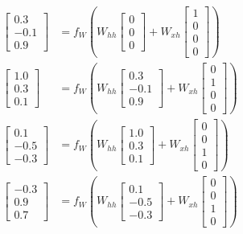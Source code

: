 \begin{align}
\begin{bmatrix} 0.3 \\ -0.1 \\ 0.9 \end{bmatrix} &= f_W \left( W_{hh} \begin{bmatrix} 0 \\ 0 \\ 0 \end{bmatrix} + W_{xh} \begin{bmatrix} 1 \\ 0 \\ 0 \\ 0 \end{bmatrix} \right) \tag{$h_1$} \\[1.5em]
\begin{bmatrix} 1.0 \\ 0.3 \\ 0.1 \end{bmatrix} &= f_W \left( W_{hh} \begin{bmatrix} 0.3 \\ -0.1 \\ 0.9 \end{bmatrix} + W_{xh} \begin{bmatrix} 0 \\ 1 \\ 0 \\ 0 \end{bmatrix} \right) \tag{$h_2$} \\[1.5em]
\begin{bmatrix} 0.1 \\ -0.5 \\ -0.3 \end{bmatrix} &= f_W \left( W_{hh} \begin{bmatrix} 1.0 \\ 0.3 \\ 0.1 \end{bmatrix} + W_{xh} \begin{bmatrix} 0 \\ 0 \\ 1 \\ 0 \end{bmatrix} \right) \tag{$h_3$} \\[1.5em]
\begin{bmatrix} -0.3 \\ 0.9 \\ 0.7 \end{bmatrix} &= f_W \left( W_{hh} \begin{bmatrix} 0.1 \\ -0.5 \\ -0.3 \end{bmatrix} + W_{xh} \begin{bmatrix} 0 \\ 0 \\ 1 \\ 0 \end{bmatrix} \right) \tag{$h_4$}
\end{align}

